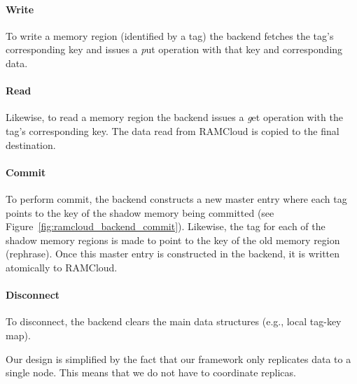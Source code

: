 \paragraph{\bf Write} To write a memory region (identified by a tag) the
backend fetches the tag's corresponding key and issues a {\emph put } operation
with that key and corresponding data.  

\paragraph{\bf Read} Likewise, to read a memory region the backend issues a
{\emph get} operation with the tag's corresponding key. The data read from
RAMCloud is copied to the final destination.  

\paragraph{\bf Commit} To perform commit, the backend constructs a new master
entry where each tag points to the key of the shadow memory being committed
(see Figure~\ref{fig:ramcloud_backend_commit}). Likewise, the tag for each of
the shadow memory regions is made to point to the key of the old memory region
(rephrase). Once this master entry is constructed in the backend, it is written
atomically to RAMCloud.  

\paragraph{\bf Disconnect} To disconnect, the backend clears the main data
structures (e.g., local tag-key map).

Our design is simplified by the fact that our framework only replicates data to
a single node. This means that we do not have to coordinate replicas.
